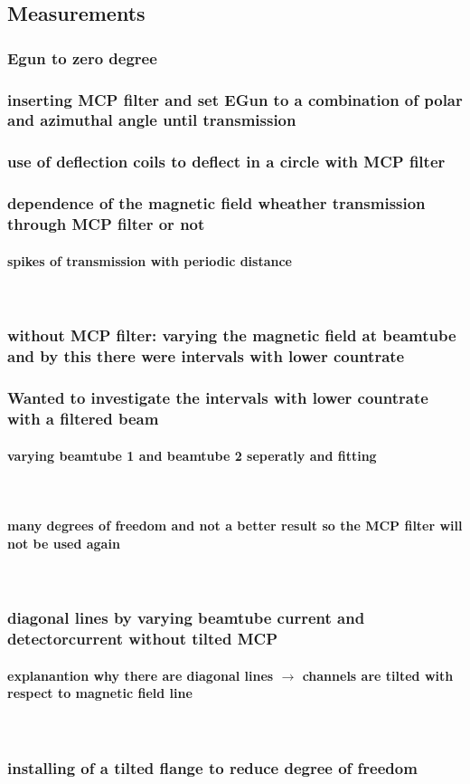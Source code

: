 \documentclass[11pt]{article} %
\newcommand{\subsubsubsection}[1]{\paragraph{#1}\mbox{}\\}
\begin{document}
	\subsection{Measurements}
		\subsubsection{Egun to zero degree} 
		\subsubsection{inserting MCP filter and set EGun to a combination of polar and azimuthal angle until transmission}
		\subsubsection{use of deflection coils to deflect in a circle with MCP filter}
		\subsubsection{dependence of the magnetic field wheather transmission through MCP filter or not}
			\subsubsubsection{spikes of transmission with periodic distance}
		\subsubsection{without MCP filter: varying the magnetic field at beamtube and by this there were intervals with lower countrate}
		\subsubsection{Wanted to investigate the intervals with lower countrate with a filtered beam}
			\subsubsubsection{varying beamtube 1 and beamtube 2 seperatly and fitting}
			\subsubsubsection{many degrees of freedom and not a better result so the MCP filter will not be used again}
		\subsubsection{diagonal lines by varying beamtube current and detectorcurrent without tilted MCP}
			\subsubsubsection{explanantion why there are diagonal lines $\rightarrow$ channels are tilted with respect to magnetic field line}
		\subsubsection{installing of a tilted flange to reduce degree of freedom}
\end{document}
